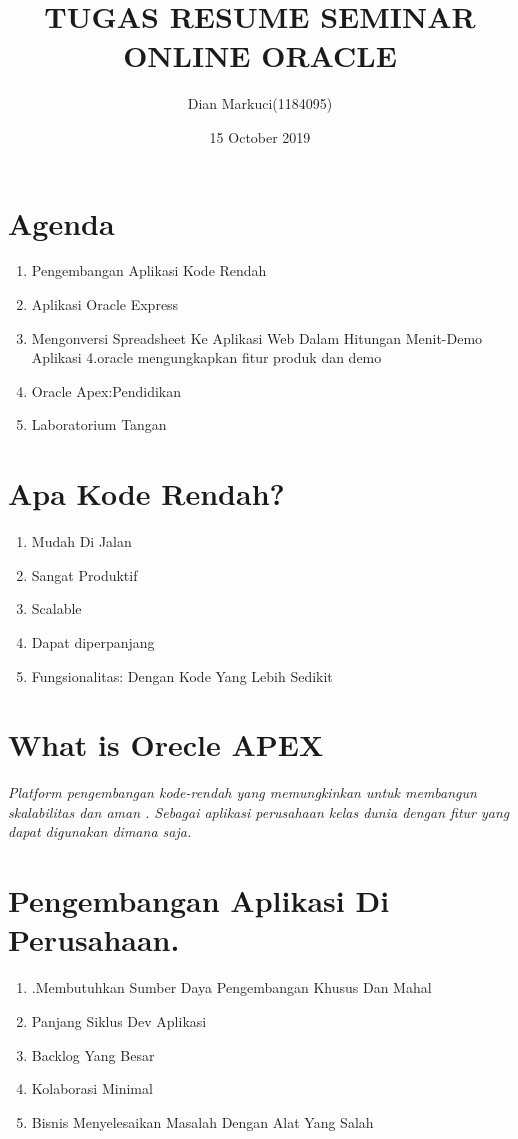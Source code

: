 \documentclass{article}
\title{TUGAS RESUME SEMINAR ONLINE ORACLE}
\author{Dian Markuci(1184095) }
\date{15 October 2019}
\begin{document}
\maketitle

\section{Agenda}
\begin{enumerate}
    \item Pengembangan Aplikasi Kode Rendah 
    \item Aplikasi Oracle Express
    \item Mengonversi Spreadsheet Ke Aplikasi Web Dalam Hitungan Menit-Demo Aplikasi 4.oracle mengungkapkan fitur produk dan demo
    \item Oracle Apex:Pendidikan
    \item Laboratorium Tangan
\end{enumerate}

\section{Apa Kode Rendah?}
\begin{enumerate}
    \item Mudah Di Jalan
    \item Sangat Produktif
    \item Scalable
    \item Dapat diperpanjang
    \item Fungsionalitas: Dengan Kode Yang Lebih Sedikit
\end{enumerate}
\section{What is Orecle APEX}
\textit{Platform pengembangan kode-rendah  yang memungkinkan untuk membangun skalabilitas dan aman . Sebagai aplikasi perusahaan kelas dunia dengan fitur yang dapat digunakan dimana saja.}
\section{Pengembangan Aplikasi Di Perusahaan.}
\begin{enumerate}

    \item .Membutuhkan Sumber Daya Pengembangan Khusus Dan Mahal
    \item Panjang Siklus Dev Aplikasi
    \item Backlog Yang Besar
    \item Kolaborasi Minimal
    \item Bisnis Menyelesaikan Masalah Dengan Alat Yang Salah
 
\end{enumerate}
\end{document}
